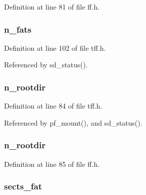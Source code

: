 Definition at line 81 of file ff.\-h.

\hypertarget{struct_f_a_t_f_s_a0ab8d1f18fe8f3574790959cadf4a8fb}{
\subsubsection[{n\-\_\-fats}]{ n\-\_\-fats}}\label{struct_f_a_t_f_s_a0ab8d1f18fe8f3574790959cadf4a8fb}


Definition at line 102 of file tff.\-h.



Referenced by sd\-\_\-status().

\hypertarget{struct_f_a_t_f_s_a5d3e6d5008f57fc6450f4bfd072c5b81}{
\subsubsection[{n\-\_\-rootdir}]{ n\-\_\-rootdir}}\label{struct_f_a_t_f_s_a5d3e6d5008f57fc6450f4bfd072c5b81}


Definition at line 84 of file tff.\-h.



Referenced by pf\-\_\-mount(), and sd\-\_\-status().

\hypertarget{struct_f_a_t_f_s_a22e74fc44cd5274ba7c3b18d5e357697}{
\subsubsection[{n\-\_\-rootdir}]{ n\-\_\-rootdir}}\label{struct_f_a_t_f_s_a22e74fc44cd5274ba7c3b18d5e357697}


Definition at line 85 of file ff.\-h.

\hypertarget{struct_f_a_t_f_s_ac2ca607e168d57a4df8298dcffb2febf}{
\subsubsection[{sects\-\_\-fat}]{ sects\-\_\-fat}}\label{struct_f_a_t_f_s_ac2ca607e168d57a4df8298dcffb2febf}


